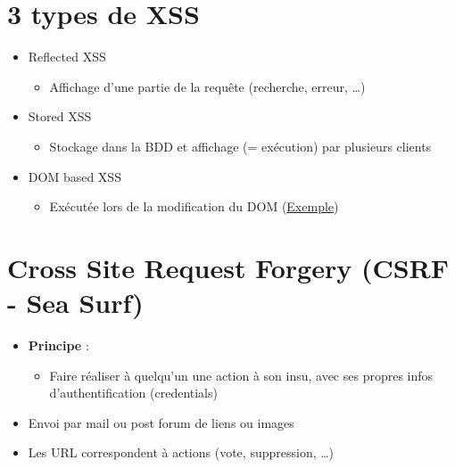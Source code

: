 \hypertarget{types-de-xss}{%
\section{3 types de XSS}\label{types-de-xss}}

\begin{itemize}
\tightlist
\item
  Reflected XSS

  \begin{itemize}
  \tightlist
  \item
    Affichage d'une partie de la requête (recherche, erreur, \ldots)
  \end{itemize}
\item
  Stored XSS

  \begin{itemize}
  \tightlist
  \item
    Stockage dans la BDD et affichage (= exécution) par plusieurs
    clients
  \end{itemize}
\item
  DOM based XSS

  \begin{itemize}
  \tightlist
  \item
    Exécutée lors de la modification du DOM
    (\href{https://www.owasp.org/index.php/DOM_Based_XSS}{Exemple})
  \end{itemize}
\end{itemize}

\hypertarget{cross-site-request-forgery-csrf---sea-surf}{%
\section{Cross Site Request Forgery (CSRF - Sea
Surf)}\label{cross-site-request-forgery-csrf---sea-surf}}

\begin{itemize}
\tightlist
\item
  \textbf{Principe} :

  \begin{itemize}
  \tightlist
  \item
    Faire réaliser à quelqu'un une action à son insu, avec ses propres
    infos d'authentification (credentials)
  \end{itemize}
\item
  Envoi par mail ou post forum de liens ou images
\item
  Les URL correspondent à actions (vote, suppression, \ldots)
\end{itemize}

